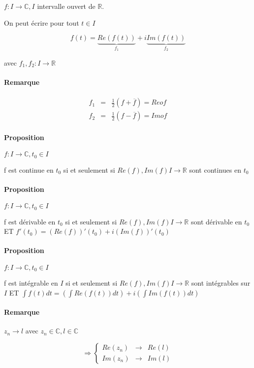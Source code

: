 $f : I \rightarrow \mathbb{C}, I$ intervalle ouvert de $\mathbb{R}$.

On peut écrire pour tout $t \in I$

\[f(t) = \underbrace{Re(f(t))}_{f_1} + i\underbrace{Im(f(t))}_{f_2}\]

avec $f_1, f_2 : I \rightarrow \mathbb{R}$

\paragraph{Remarque}

\[\begin{array}{rcl}
	f_1 &=& \frac{1}{2}(f + \overline{f}) = Re o f \\
	f_2 &=& \frac{1}{2}(f - \overline{f}) = Im o f
\end{array}\]

\paragraph{Proposition} $f : I \rightarrow \mathbb{C}, t_0 \in I$

f est continue en $t_0$ si et seulement si $Re(f), Im(f) I \rightarrow \mathbb{R}$ sont continues en $t_0$

\paragraph{Proposition} $f : I \rightarrow \mathbb{C}, t_0 \in I$

f est dérivable en $t_0$ si et seulement si $Re(f), Im(f) I \rightarrow \mathbb{R}$ sont dérivable en $t_0$
ET $f'(t_0) = (Re(f))'(t_0) + i (Im(f))'(t_0)$

\paragraph{Proposition} $f : I \rightarrow \mathbb{C}, t_0 \in I$

f est intégrable en $I$ si et seulement si $Re(f), Im(f) I \rightarrow \mathbb{R}$ sont intégrables sur $I$
ET $\int f(t)dt = (\int Re(f(t))dt) + i (\int Im(f(t))dt)$

\paragraph{Remarque}

$z_n \rightarrow l$ avec $z_n \in \mathbb{C}, l \in \mathbb{C}$

\[\Rightarrow \left\{\begin{array}{rcl}
	Re(z_n) &\rightarrow& Re(l) \\
	Im(z_n) &\rightarrow& Im(l)\end{array}\right.\]

